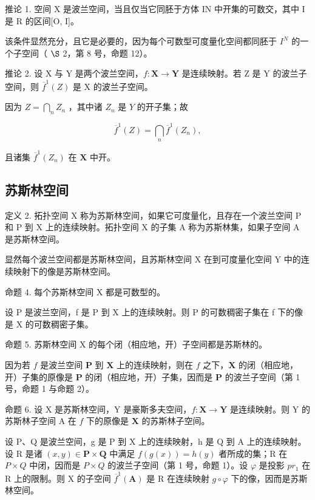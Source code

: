 推论 1. 空间 X 是波兰空间，当且仅当它同胚于方体 IN 中开集的可数交，其中 I 是 R 的区间{[}O, I{]}。

该条件显然充分，且它是必要的，因为每个可数型可度量化空间都同胚于 \(I^{N}\) 的一个子空间（ \(\S\) 2，第 8 号，命题 12）。

推论 2. 设 X 与 Y 是两个波兰空间，\(f: \mathbf{X} \to \mathbf{Y}\) 是连续映射。若 Z 是 Y 的波兰子空间，则 \(\overline{f}^{1}(Z)\) 是 X 的波兰子空间。

因为 \(Z = \bigcap_{n} Z_n\) ，其中诸 \(Z_n\) 是 \(Y\) 的开子集；故

\[
\overline {{{f}}} ^ {1} (Z) = \bigcap_ {n} \overline {{{f}}} ^ {1} (Z _ {n}),
\]

且诸集 \(\overline{f}^1 (Z_n)\) 在 \(\mathbf{X}\) 中开。

\subsection{苏斯林空间}

定义 2. 拓扑空间 X 称为苏斯林空间，如果它可度量化，且存在一个波兰空间 P 和 P 到 X 上的连续映射。拓扑空间 X 的子集 A 称为苏斯林集，如果子空间 A 是苏斯林空间。

显然每个波兰空间都是苏斯林空间，且苏斯林空间 X 在到可度量化空间 Y 中的连续映射下的像是苏斯林空间。

命题 4. 每个苏斯林空间 X 都是可数型的。

设 P 是波兰空间，f 是 P 到 X 上的连续映射。则 P 的可数稠密子集在 f 下的像是 X 的可数稠密子集。

命题 5. 苏斯林空间 X 的每个闭（相应地，开）子空间都是苏斯林的。

因为若 \(f\) 是波兰空间 \(\mathbf{P}\) 到 \(\mathbf{X}\) 上的连续映射，则在 \(f\) 之下，\(\mathbf{X}\) 的闭（相应地，开）子集的原像是 \(\mathbf{P}\) 的闭（相应地，开）子集，因而是 \(\mathbf{P}\) 的波兰子空间（第 1 号，命题 1 与命题 2）。

命题 6. 设 X 是苏斯林空间，Y 是豪斯多夫空间，\(f: \mathbf{X} \to \mathbf{Y}\) 是连续映射。则 Y 的苏斯林子空间 A 在 \(f\) 下的原像是 \(\mathbf{X}\) 的苏斯林子空间。

设 P、Q 是波兰空间，g 是 P 到 X 上的连续映射，h 是 Q 到 A 上的连续映射。设 R 是诸 \((x,y)\in\mathbf{P}\times\mathbf{Q}\) 中满足 \(f(g(x))=h(y)\) 者所成的集；R 在 \(P\times Q\) 中闭，因而是 \(P\times Q\) 的波兰子空间（第 1 号，命题 1）。设 \(\varphi\) 是投影 \(pr_{1}\) 在 R 上的限制。则 X 的子空间 \(\overline{f}^{1}(\mathbf{A})\) 是 R 在连续映射 \(g\circ\varphi\) 下的像，因而是苏斯林空间。

